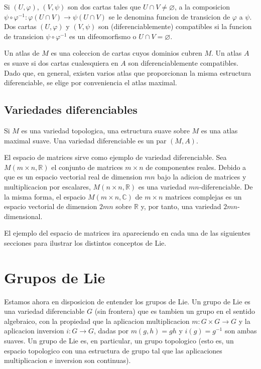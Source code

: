 \documentclass[12pt]{extarticle}
\newcommand{\R}{\mathbb{R}}
\newcommand{\C}{\mathbb{C}}
\newcommand{\<}{\langle}
\renewcommand{\>}{\rangle}
\renewcommand{\emptyset}{\varnothing}
\theoremstyle{definition}
\begin{document}
Si $(U, \varphi)$, $(V, \psi)$ son dos cartas tales que $U \cap V \neq
\emptyset$, a la composicion $\psi \circ \varphi^{-1}: \varphi(U \cap V)
\rightarrow \psi(U \cap V)$ se le denomina funcion de transicion de $\varphi$ a
$\psi$. Dos cartas $(U, \varphi)$ y $(V, \psi)$ son (diferenciablemente)
compatibles si la funcion de transicion $\psi \circ \varphi^{-1}$ es un
difeomorfismo o $U \cap V = \emptyset$.

Un atlas de $M$ es una coleccion de cartas cuyos dominios cubren $M$. Un atlas $A$
es suave si dos cartas cualesquiera en $A$ son diferenciablemente compatibles.
Dado que, en general, existen varios atlas que proporcionan la misma
estructura diferenciable, se elige por conveniencia el atlas maximal.

\subsection{Variedades diferenciables}
Si $M$ es una variedad topologica, una estructura suave sobre $M$ es una atlas
maximal suave. Una variedad diferenciable es un par $(M, A)$.

El espacio de matrices sirve como ejemplo de variedad diferenciable.
Sea $M(m \times n, \R)$ el conjunto de matrices $m \times n$ de componentes
reales. Debido a que es un espacio vectorial real de dimension $mn$ bajo la
adicion de matrices y multiplicacion por escalares, $M(n \times n, \R)$ es una
variedad $mn$-diferenciable. De la misma forma, el espacio $M(m \times n, \C)$
de $m \times n$ matrices complejas es un espacio vectorial de dimension $2mn$
sobre $\R$ y, por tanto, una variedad $2mn$-dimensional.

El ejemplo del espacio de matrices ira apareciendo en cada una de las siguientes
secciones para ilustrar los distintos conceptos de Lie.

\section{Grupos de Lie}
Estamos ahora en disposicion de entender los grupos de Lie. Un grupo de Lie es
una variedad diferenciable $G$ (sin frontera) que es tambien un grupo en el
sentido algebraico, con la propiedad que la aplicacion multiplicacion $m : G
\times G \rightarrow G$ y la aplicacion inversion $i : G \rightarrow G$, dadas
por $m(g, h)=gh$ y $i(g) = g^{-1}$ son ambas suaves. Un grupo de Lie es, en
particular, un grupo topologico (esto es, un espacio topologico con una
estructura de grupo tal que las aplicaciones multiplicacion e inversion son
continuas).
\end{document}
